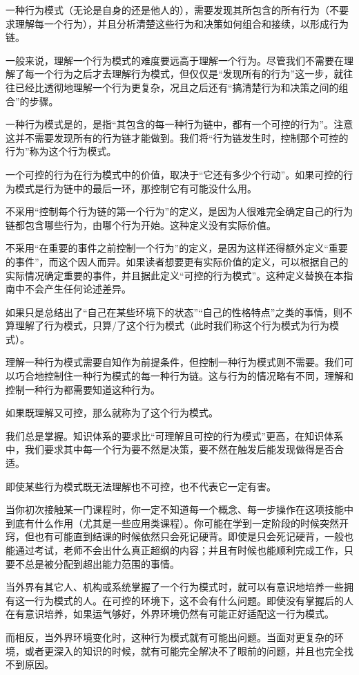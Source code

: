\label{def:理解行为模式}一种行为模式（无论是自身的还是他人的），需要发现其所包含的所有行为（不要求理解每一个行为），并且分析清楚这些行为和决策如何组合和接续，以形成行为链。
\begin{explain}
一般来说，理解一个行为模式的难度要远高于理解一个行为。尽管我们不需要在理解了每一个行为之后才去理解行为模式，但仅仅是“发现所有的行为”这一步，就往往已经比透彻地理解一个行为更复杂，况且之后还有“搞清楚行为和决策之间的组合”的步骤。
\end{explain}
一种行为模式是的，是指“其包含的每一种行为链中，都有一个可控的行为”。注意这并不需要发现所有的行为链才能做到。我们将“行为链发生时，控制那个可控的行为”称为这个行为模式。
\begin{explain}
一个可控的行为在行为模式中的价值，取决于“它还有多少个行动”。如果可控的行为模式是行为链中的最后一环，那控制它有可能没什么用。

不采用“控制每个行为链的第一个行为”的定义，是因为人很难完全确定自己的行为链都包含哪些行为，由哪个行为开始。这种定义没有实际价值。

不采用“在重要的事件之前控制一个行为”的定义，是因为这样还得额外定义“重要的事件”，而这个因人而异。如果读者想要更有实际价值的定义，可以根据自己的实际情况确定重要的事件，并且据此定义“可控的行为模式”。这种定义替换在本指南中不会产生任何论述差异。
\end{explain}
如果只是总结出了“自己在某些环境下的状态”“自己的性格特点”之类的事情，则不算理解了行为模式，只算/了这个行为模式（此时我们称这个行为模式为行为模式）。
\begin{explain}
理解一种行为模式需要自知作为前提条件，但控制一种行为模式则不需要。我们可以巧合地控制住一种行为模式的每一种行为链。这与行为的情况略有不同，理解和控制一种行为都需要知道这种行为。
\end{explain}
如果既理解又可控，那么就称为了这个行为模式。
\begin{explain}
我们总是掌握。知识体系的要求比“可理解且可控的行为模式”更高，在知识体系中，我们要求其中每一个行为要不然是决策，要不然在触发后能发现做得是否合适。
\end{explain}
即使某些行为模式既无法理解也不可控，也不代表它一定有害。
\begin{examples}
当你初次接触某一门课程时，你一定不知道每一个概念、每一步操作在这项技能中到底有什么作用（尤其是一些应用类课程）。你可能在学到一定阶段的时候突然开窍，但也有可能直到结课的时候依然只会死记硬背。即使是只会死记硬背，一般也能通过考试，老师不会出什么真正超纲的内容；并且有时候也能顺利完成工作，只要不总是被分配到超出能力范围的事情。

当外界有其它人、机构或系统掌握了一个行为模式时，就可以有意识地培养一些拥有这一行为模式的人。在可控的环境下，这不会有什么问题。即使没有掌握后的人在有意识培养，如果运气够好，外界环境仍然有可能正好适配这一行为模式。

而相反，当外界环境变化时，这种行为模式就有可能出问题。当面对更复杂的环境，或者更深入的知识的时候，就有可能完全解决不了眼前的问题，并且也完全找不到原因。
\end{examples}

